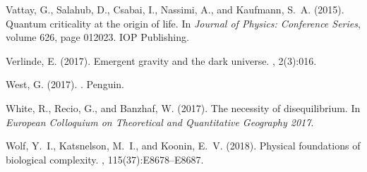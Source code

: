 \documentclass[graybox]{svmult}
\begin{document}
\begin{thebibliography}{}
Vattay, G., Salahub, D., Csabai, I., Nassimi, A., and Kaufmann, S.~A. (2015).
\newblock Quantum criticality at the origin of life.
\newblock In {\em Journal of Physics: Conference Series}, volume 626, page
  012023. IOP Publishing.

Verlinde, E. (2017).
\newblock Emergent gravity and the dark universe.
, 2(3):016.

West, G. (2017).
.
\newblock Penguin.

White, R., Recio, G., and Banzhaf, W. (2017).
\newblock The necessity of disequilibrium.
\newblock In {\em European Colloquium on Theoretical and Quantitative Geography
  2017}.

Wolf, Y.~I., Katsnelson, M.~I., and Koonin, E.~V. (2018).
\newblock Physical foundations of biological complexity.
,
  115(37):E8678--E8687.

\end{thebibliography}
\end{document}
